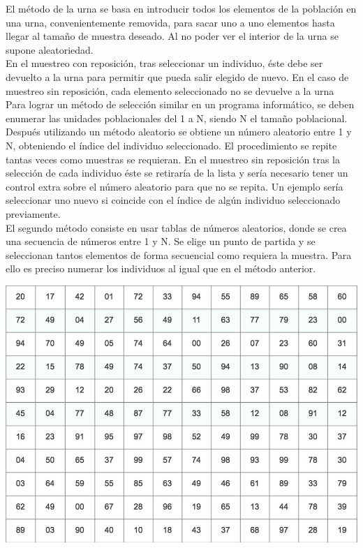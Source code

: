 El método de la urna se basa en introducir todos los elementos de la población en una urna, convenientemente removida, para sacar uno a uno elementos hasta llegar al tamaño de muestra deseado. Al no poder ver el interior de la urna se supone aleatoriedad.\\

En el muestreo con reposición, tras seleccionar un individuo, éste debe ser devuelto a la urna para permitir que pueda salir elegido de nuevo. En el caso de muestreo sin reposición, cada elemento seleccionado no se devuelve a la urna\\

Para lograr un método de selección similar en un programa informático, se deben enumerar las unidades poblacionales del 1 a N, siendo N el tamaño poblacional. Después utilizando un método aleatorio se obtiene un número aleatorio entre 1 y N, obteniendo el índice del individuo seleccionado. El procedimiento se repite tantas veces como muestras se requieran. En el muestreo sin reposición tras la selección de cada individuo éste se retiraría de la lista y sería necesario tener un control extra sobre el número aleatorio para que no se repita. Un ejemplo sería seleccionar uno nuevo si coincide con el índice de algún individuo seleccionado previamente.\\

El segundo método consiste en usar tablas de números aleatorios, donde se crea una secuencia de números entre 1 y N. Se elige un punto de partida y se seleccionan tantos elementos de forma secuencial como requiera la muestra. Para ello es preciso numerar los individuos al igual que en el método anterior.\\

\begin{center}
    \includegraphics[scale=0.4]{img/tablanumeros.png}
    \label{fig:tablanumeros}
\end{center}

